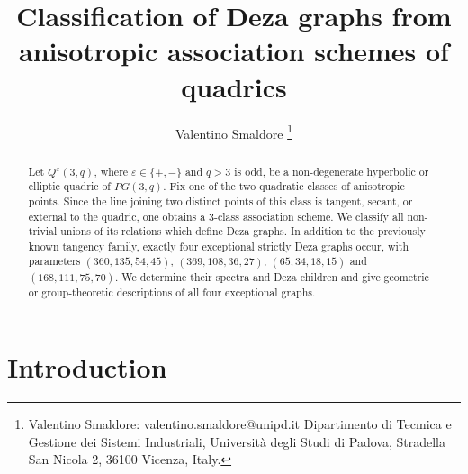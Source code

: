 \documentclass{article}
\title{Classification of Deza graphs from anisotropic association schemes of quadrics}
\author{Valentino Smaldore \footnote{Valentino Smaldore:
valentino.smaldore@unipd.it %
Dipartimento di Tecmica e Gestione dei Sistemi Industriali,
Universit\`{a} degli Studi di Padova, Stradella San Nicola 2, 36100 Vicenza, Italy.}}
\date{}
\theoremstyle{plain}
\begin{document}
\maketitle
\begin{abstract}
Let $Q^\varepsilon(3,q)$, where
$\varepsilon\in\{+,-\}$ and $q>3$ is odd, be a non-degenerate hyperbolic or elliptic quadric of $PG(3,q)$. Fix one of the two quadratic classes of anisotropic points. Since the line joining two distinct points of this class is tangent, secant, or external to the quadric, one obtains a $3$-class association scheme. We classify all non-trivial unions of its relations which define Deza graphs. In addition to the previously known tangency family, exactly four exceptional strictly Deza graphs occur, with parameters $(360,135,54,45)$, $(369,108,36,27)$, $(65,34,18,15)$ and $(168,111,75,70)$. We determine their spectra and Deza children and give geometric or group-theoretic descriptions of all four exceptional graphs. 
\end{abstract}




\section{Introduction}
\end{document}
